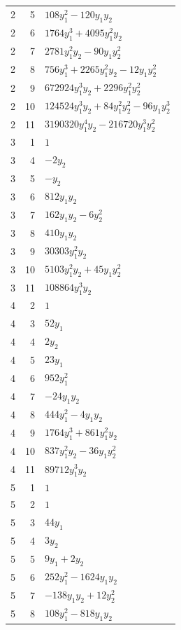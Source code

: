 \documentclass[10pt,a4paper]{article}
\begin{document}
{\begin{longtable}{rrp{125mm}}
2 & 5 & $108 y_{1}^{2} - 120 y_{1} y_{2}$\\
2 & 6 & $1764 y_{1}^{3} + 4095 y_{1}^{2} y_{2}$\\
2 & 7 & $2781 y_{1}^{2} y_{2} - 90 y_{1} y_{2}^{2}$\\
2 & 8 & $756 y_{1}^{3} + 2265 y_{1}^{2} y_{2} - 12 y_{1} y_{2}^{2}$\\
2 & 9 & $672924 y_{1}^{3} y_{2} + 2296 y_{1}^{2} y_{2}^{2}$\\
2 & 10 & $124524 y_{1}^{3} y_{2} + 84 y_{1}^{2} y_{2}^{2} - 96 y_{1} y_{2}^{3}$\\
2 & 11 & $3190320 y_{1}^{4} y_{2} - 216720 y_{1}^{3} y_{2}^{2}$\\
3 & 1 & $1$\\
3 & 4 & $- 2 y_{2}$\\
3 & 5 & $- y_{2}$\\
3 & 6 & $812 y_{1} y_{2}$\\
3 & 7 & $162 y_{1} y_{2} - 6 y_{2}^{2}$\\
3 & 8 & $410 y_{1} y_{2}$\\
3 & 9 & $30303 y_{1}^{2} y_{2}$\\
3 & 10 & $5103 y_{1}^{2} y_{2} + 45 y_{1} y_{2}^{2}$\\
3 & 11 & $108864 y_{1}^{3} y_{2}$\\
4 & 2 & $1$\\
4 & 3 & $52 y_{1}$\\
4 & 4 & $2 y_{2}$\\
4 & 5 & $23 y_{1}$\\
4 & 6 & $952 y_{1}^{2}$\\
4 & 7 & $- 24 y_{1} y_{2}$\\
4 & 8 & $444 y_{1}^{2} - 4 y_{1} y_{2}$\\
4 & 9 & $1764 y_{1}^{3} + 861 y_{1}^{2} y_{2}$\\
4 & 10 & $837 y_{1}^{2} y_{2} - 36 y_{1} y_{2}^{2}$\\
4 & 11 & $89712 y_{1}^{3} y_{2}$\\
5 & 1 & $1$\\
5 & 2 & $1$\\
5 & 3 & $44 y_{1}$\\
5 & 4 & $3 y_{2}$\\
5 & 5 & $9 y_{1} + 2 y_{2}$\\
5 & 6 & $252 y_{1}^{2} - 1624 y_{1} y_{2}$\\
5 & 7 & $- 138 y_{1} y_{2} + 12 y_{2}^{2}$\\
5 & 8 & $108 y_{1}^{2} - 818 y_{1} y_{2}$\\

\end{longtable}}
\end{document}
